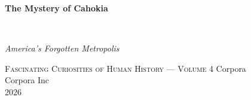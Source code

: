 \clearpage
\vspace*{1.5in}
\begin{center}
  \begin{minipage}{\textwidth}
    \centering
    \Huge\bfseries
    \linespread{1.25}\selectfont
    The Mystery of Cahokia
  \end{minipage}
  \\[3em]
  {\Large\itshape\linespread{1.3}\selectfont
  America's Forgotten Metropolis\par}
  \vspace{2em}
  {\small\scshape Fascinating Curiosities of Human History — Volume 4}
  \vfill
  {\large Corpora}
  \\[1em]
  {\large Corpora Inc}
  \\[1em]
  {\large 2026}
\end{center}
\clearpage
